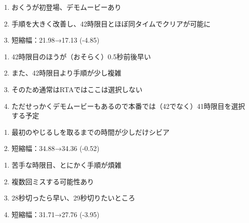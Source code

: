 \begin{enumerate}[label={\sarrow}]
\item おくうが初登場、デモムービーあり
\item 手順を大きく改善し、42時限目とほぼ同タイムでクリアが可能に
\item 短縮幅：21.98→17.13 (-4.85)
\end{enumerate}
\begin{marker}
\begin{enumerate}[label={\sarrow}]
\item 42時限目のほうが（おそらく）0.5秒前後早い
\item また、42時限目より手順が少し複雑
\item そのため通常はRTAではここは選択しない
\item ただせっかくデモムービーもあるので本番では（42でなく）41時限目を選択する予定
\end{enumerate}
\end{marker}


\begin{enumerate}[label={\sarrow}]
\item 最初のやじるしを取るまでの時間が少しだけシビア
\item 短縮幅：34.88→34.36 (-0.52)
\end{enumerate}



\begin{enumerate}[label={\sarrow}]
\item 苦手な時限目、とにかく手順が煩雑
\item 複数回ミスする可能性あり
\item 28秒切ったら早い、29秒切りたいところ
\item 短縮幅：31.71→27.76 (-3.95)
\end{enumerate}




